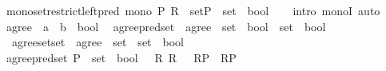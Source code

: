 \begin{isabellebody}
\endisatagproof
{\isafoldproof}%
%
\isadelimproof
\isanewline
%
\endisadelimproof
\isanewline
{}\isamarkupfalse%
\ mono{\isacharunderscore}{\kern0pt}set{\isacharunderscore}{\kern0pt}restrict{\isacharunderscore}{\kern0pt}left{\isacharunderscore}{\kern0pt}pred{\isacharcolon}{\kern0pt}\ {\isachardoublequoteopen}mono\ {\isacharparenleft}{\kern0pt}{\isasymlambda}P{\isachardot}{\kern0pt}\ {\isacharparenleft}{\kern0pt}R\ {\isacharcolon}{\kern0pt}{\isacharcolon}{\kern0pt}\ set{\isacharparenright}{\kern0pt}{\isasymrestriction}\isactrlbsub P\ {\isacharcolon}{\kern0pt}{\isacharcolon}{\kern0pt}\ set\ {\isasymRightarrow}\ bool\isactrlesub {\isacharparenright}{\kern0pt}{\isachardoublequoteclose}\isanewline
%
\isadelimproof
\ \ %
\endisadelimproof
%
\isatagproof
{}\isamarkupfalse%
\ {\isacharparenleft}{\kern0pt}intro\ monoI{\isacharparenright}{\kern0pt}\ auto%
\endisatagproof
{\isafoldproof}%
%
\isadelimproof
\isanewline
%
\endisadelimproof
\isanewline
\isanewline
{}\isamarkupfalse%
\ agree\ {\isacharcolon}{\kern0pt}{\isacharcolon}{\kern0pt}\ {\isachardoublequoteopen}{\isacharprime}{\kern0pt}a\ {\isasymRightarrow}\ {\isacharprime}{\kern0pt}b\ {\isasymRightarrow}\ bool{\isachardoublequoteclose}\isanewline
\isanewline
{}\isamarkupfalse%
\isanewline
\ \ agree{\isacharunderscore}{\kern0pt}pred{\isacharunderscore}{\kern0pt}set\ {\isasymequiv}\ {\isachardoublequoteopen}agree\ {\isacharcolon}{\kern0pt}{\isacharcolon}{\kern0pt}\ {\isacharparenleft}{\kern0pt}set\ {\isasymRightarrow}\ bool{\isacharparenright}{\kern0pt}\ {\isasymRightarrow}\ set\ {\isasymRightarrow}\ bool{\isachardoublequoteclose}\isanewline
\ \ agree{\isacharunderscore}{\kern0pt}set{\isacharunderscore}{\kern0pt}set\ {\isasymequiv}\ {\isachardoublequoteopen}agree\ {\isacharcolon}{\kern0pt}{\isacharcolon}{\kern0pt}\ set\ {\isasymRightarrow}\ set\ {\isasymRightarrow}\ bool{\isachardoublequoteclose}\isanewline
{}\isanewline
\ \ \isamarkupfalse%
\ {\isachardoublequoteopen}agree{\isacharunderscore}{\kern0pt}pred{\isacharunderscore}{\kern0pt}set\ {\isacharparenleft}{\kern0pt}P\ {\isacharcolon}{\kern0pt}{\isacharcolon}{\kern0pt}\ set\ {\isasymRightarrow}\ bool{\isacharparenright}{\kern0pt}\ {\isasymR}\ {\isasymequiv}\ {\isasymforall}R\ R{\isacharprime}{\kern0pt}\ {\isasymin}\ {\isasymR}{\isachardot}{\kern0pt}\ R{\isasymrestriction}\isactrlbsub P\isactrlesub \ {\isacharequal}{\kern0pt}\ R{\isacharprime}{\kern0pt}{\isasymrestriction}\isactrlbsub P\isactrlesub {\isachardoublequoteclose}\isanewline
\ \ \isamarkupfalse%

\end{isabellebody}
